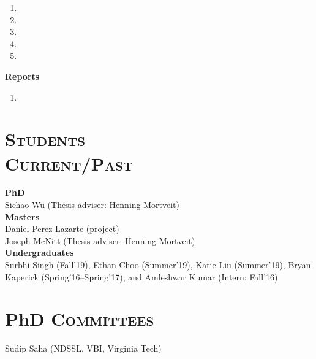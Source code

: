 \documentclass[10pt]{article} %
\begin{document}
\begin{resume}
{\begin{enumerate}[1.]
\item {}
\item {}
\item {}
\item {}
\item {}
\end{enumerate}
\noindent\textbf{Reports}\\
\begin{enumerate}[1.]
\item {}
\end{enumerate}
}
\section{\textnormal{\textsc{Students \\Current/Past}}}
\noindent\textbf{PhD}\\
Sichao Wu (Thesis adviser: Henning Mortveit)\vspace{.2cm}\\
\noindent\textbf{Masters}\\
Daniel Perez Lazarte (project)\\
Joseph McNitt (Thesis adviser: Henning Mortveit)\vspace{.2cm}\\
\noindent\textbf{Undergraduates}\\
Surbhi Singh (Fall'19),
Ethan Choo (Summer'19),
Katie Liu (Summer'19),
Bryan Kaperick (Spring'16--Spring'17), and
Amleshwar Kumar (Intern: Fall'16)
\section{\textnormal{PhD \textsc{Committees}}}
Sudip Saha (NDSSL, VBI, Virginia Tech)

\end{resume}
\end{document}
